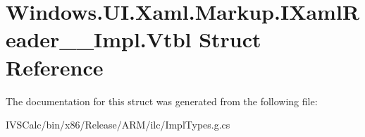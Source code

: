 \hypertarget{struct_windows_1_1_u_i_1_1_xaml_1_1_markup_1_1_i_xaml_reader_____impl_1_1_vtbl}{}\section{Windows.\+U\+I.\+Xaml.\+Markup.\+I\+Xaml\+Reader\+\_\+\+\_\+\+Impl.\+Vtbl Struct Reference}
\label{struct_windows_1_1_u_i_1_1_xaml_1_1_markup_1_1_i_xaml_reader_____impl_1_1_vtbl}


The documentation for this struct was generated from the following file\+:\begin{DoxyCompactItemize}
\item 
I\+V\+S\+Calc/bin/x86/\+Release/\+A\+R\+M/ilc/Impl\+Types.\+g.\+cs\end{DoxyCompactItemize}
